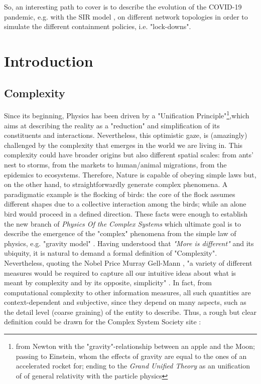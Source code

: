 \documentclass[a4paper,12pt,twoside]{book} %
\theoremstyle{definition}
\begin{document}
So, an interesting path to cover is to describe the evolution of the COVID-19 pandemic, e.g. with the SIR model \cite{pizzuti::2020_ItalyCOVIDnetwork}, on different network topologies in order to simulate the different containment policies, i.e. "lock-downs".

\mainmatter

\newcommand{\changefont}{%
    \fontsize{12}{12}
}
\pagestyle{fancy}
\fancyhf{}
\fancyhead[LE,RO]{\changefont \slshape \nouppercase{\rightmark}} %
\fancyhead[RE,LO]{\changefont \slshape \nouppercase{\leftmark}} %
\fancyfoot[C]{\thepage}

\chapter[Introduction]{Introduction}
%

\section{Complexity}
Since its beginning, Physics has been driven by a "Unification Principle"\footnote{from Newton with the "gravity"-relationship between an apple and the Moon; passing to Einstein, whom the effects of gravity are equal to the ones of an accelerated rocket for; ending to the \textit{Grand Unified Theory} as an unification of of general relativity with the particle physics},which aims at describing the reality as a "reduction" and simplification of its constituents and interactions. Nevertheless, this optimistic gaze, is (amazingly) challenged by the complexity that emerges in the world we are living in. This complexity could have broader origins but also different spatial scales: from ants' nest to storms, from the markets to human/animal migrations, from the epidemics to ecosystems. Therefore, Nature is capable of obeying simple laws but, on the other hand, to straightforwardly generate complex phenomena. A paradigmatic example is the flocking of birds: the core of the flock assumes different shapes due to a collective interaction among the birds; while an alone bird would proceed in a defined direction.
These facts were enough to establish the new branch of \textit{Physics Of the Complex Systems} which ultimate goal is to describe the emergence of the "complex" phenomena from the simple law of physics, e.g. "gravity model" \cite{GravityModelsandEmpiricalTrade}.
Having understood that \textit{"More is different"} \cite{Anderson:1972_MoreIsDifferent} and its ubiquity, it is natural to demand a formal definition of "Complexity". Nevertheless, quoting the Nobel Price Murray Gell-Mann \cite{Gell-Man:1987_S&C}, "a variety of different measures would be required to capture all our intuitive ideas about what is meant by complexity and by its opposite, simplicity" . In fact, from computational complexity to other information measures, all such quantities are context-dependent and subjective, since they depend on many aspects, such as the detail level (coarse graining) of the entity to describe. Thus, a rough but clear definition could be drawn for the Complex System Society site \cite{CSS:2021_compsystdef}:
\end{document}
